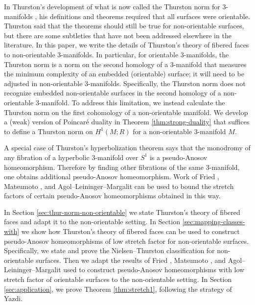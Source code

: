  In Thurston's development of what is now called the Thurston norm for 3-manifolds \cite{thurston1986norm}, his definitions and theorems required that all surfaces were orientable.  Thurston said that the theorems should still be true for non-orientable surfaces, but there are some subtleties that have not been addressed elsewhere in the literature.  In this paper, we write the details of Thurston's theory of fibered faces to non-orientable 3-manifolds.  In particular, for orientable 3-manifolds, the Thurston norm is a norm on the second homology of a 3-manifold that measures the minimum complexity of an embedded (orientable) surface; it will need to be adjusted in non-orientable 3-manifolds. Specifically, the Thurston norm does not recognize embedded non-orientable surfaces in the second homology of a non-orientable 3-manifold.  To address this limitation, we instead calculate the Thurston norm on the first cohomology of a non-orientable manifold.  We develop a (weak) version of Poincar\'e duality in Theorem \ref{thm:strong-duality} that suffices to define a Thurston norm on $H^1(M;R)$ for a non-orientable 3-manifold $M$.

 A special case of Thurston's hyperbolization theorem says that the monodromy of any fibration of a hyperbolic 3-manifold over $S^1$ is a pseudo-Anosov homeomorphism.  Therefore by finding other fibrations of the same 3-manifold, one obtains additional pseudo-Anosov homeomorphism.  Work of Fried \cite{fried1982flow,fried1983transitive}, Matsumoto \cite{matsumoto1987topological}, and Agol--Leininger--Margalit \cite{agol6983pseudo} can be used to bound the stretch factors of certain pseudo-Anosov homeomorphisms obtained in this way.



 In Section \ref{sec:thur-norm-non-orientable} we state Thurston's theory of fibered faces and adapt it to the non-orientable setting.  In Section \ref{sec:mapping-classes-with} we show how Thurston's theory of fibered faces can be used to construct pseudo-Anosov homeomorphisms of low stretch factor for non-orientable surfaces.  Specifically, we state and prove the Nielsen--Thurston classification for non-orientable surfaces.  Then we adapt the results of Fried \cite{fried1982flow,fried1983transitive}, Matsumoto \cite{matsumoto1987topological}, and Agol--Leininger--Margalit \cite{agol6983pseudo} used to construct pseudo-Anosov homeomorphisms with low stretch factor of orientable surfaces to the non-orientable setting.  In Section \ref{sec:application}, we prove Theorem \ref{thm:stretch1}, following the strategy of Yazdi.

